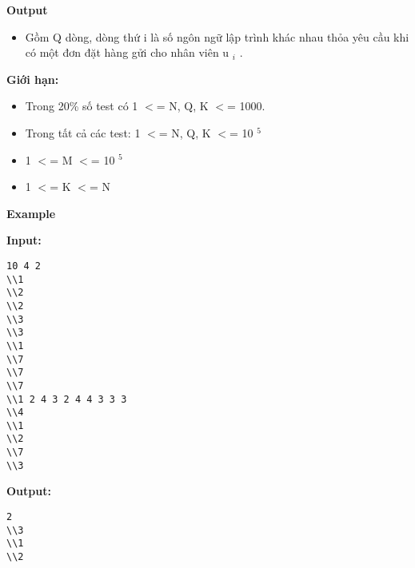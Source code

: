 \textbf{    Output   }
\begin{itemize}
	\item     Gồm Q dòng, dòng thứ i là số ngôn ngữ lập trình khác nhau thỏa yêu cầu khi có một đơn đặt hàng gửi cho nhân viên u    $_     i    $    .   
\end{itemize}

\textbf{    Giới hạn:   }
\begin{itemize}
	\item     Trong 20\% số test có 1 $<$= N, Q, K      $<$= 1000.   
	\item     Trong tất cả các test: 1 $<$= N, Q, K      $<$= 10    $^     5    $
	\item     1 $<$= M $<$= 10    $^     5    $
	\item     1 $<$= K $<$= N   
\end{itemize}



\textbf{    Example   }

\textbf{    Input:   }
\begin{verbatim}
10 4 2
\\1
\\2
\\2
\\3
\\3
\\1
\\7
\\7
\\7
\\1 2 4 3 2 4 4 3 3 3
\\4
\\1
\\2
\\7
\\3\end{verbatim}

\textbf{    Output:   }
\begin{verbatim}
2
\\3
\\1
\\2\end{verbatim}